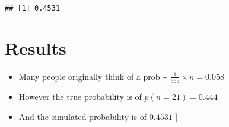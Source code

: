 \documentclass[
]{book}
\begin{document}
\begin{verbatim}
## [1] 0.4531
\end{verbatim}

\hypertarget{results}{%
\chapter{Results}\label{results}}

\begin{itemize}
\item
  Many people originally think of a prob \textasciitilde{} \(\frac{1}{365} \times n = 0.058\)
\item
  However the true probability is of \(p(n= 21) = 0.444\)
\item
  And the simulated probability is of \(0.4531\)
  {]}
\end{itemize}
\end{document}
